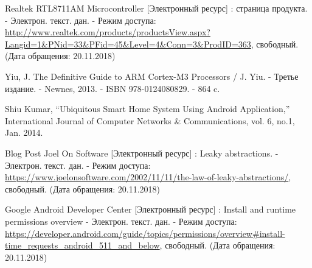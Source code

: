 \begin{my_enumerate}
\item Realtek RTL8711AM Microcontroller [Электронный ресурс] : страница продукта. - Электрон. текст. дан. - Режим доступа: \url{http://www.realtek.com/products/productsView.aspx?Langid=1&PNid=33&PFid=45&Level=4&Conn=3&ProdID=363}, свободный. (Дата обращения: 20.11.2018)

\item Yiu, J. The Definitive Guide to ARM Cortex-M3 Processors / J. Yiu. - Третье издание. - Newnes, 2013. - ISBN 978-0124080829. - 864 c.

\item Shiu Kumar, “Ubiquitous Smart Home System Using Android Application,” International Journal of Computer Networks \& Communications, vol. 6, no.1, Jan. 2014. 

\item Blog Post Joel On Software [Электронный ресурс] : Leaky abstractions. - Электрон. текст. дан. - Режим доступа: \url{https://www.joelonsoftware.com/2002/11/11/the-law-of-leaky-abstractions/}, свободный. (Дата обращения: 20.11.2018)

\item Google Android Developer Center [Электронный ресурс] : Install and runtime permissions overview - Электрон. текст. дан. - Режим доступа: \url{https://developer.android.com/guide/topics/permissions/overview#install-time_requests_android_511_and_below}, свободный. (Дата обращения: 20.11.2018)

\end{my_enumerate}

